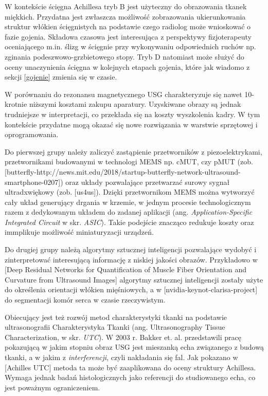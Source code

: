 W kontekście ścięgna Achillesa tryb B jest użyteczny do obrazowania tkanek miękkich. Przydatna jest zwłaszcza możliwość zobrazowania ukierunkowania struktur włókien ścięgnistych na podstawie czego radiolog może wnioskować o fazie gojenia. Składowa czasowa jest interesująca z perspektywy fizjoterapeuty oceniającego m.in. ślizg w ścięgnie przy wykonywaniu odpowiednich ruchów np. zginania podeszwowo-grzbietowego stopy. Tryb D natomiast może służyć do oceny unaczynienia ścięgna w kolejnych etapach gojenia, które jak wiadomo z sekcji \ref{gojenie} zmienia się w czasie.

W porównaniu do rezonansu magnetycznego USG charakteryzuje się nawet 10-krotnie niższymi kosztami zakupu aparatury. Uzyskiwane obrazy są jednak trudniejsze w interpretacji, co przekłada się na koszty wyszkolenia kadry. W tym kontekście przydatne mogą okazać się nowe rozwiązania w warstwie sprzętowej i oprogramowania. 

Do pierwszej grupy należy zaliczyć zastąpienie przetworników z piezoelektrykami, przetwornikami budowanymi w technologi MEMS np. cMUT, czy pMUT (zob. [butterfly-http://news.mit.edu/2018/startup-butterfly-network-ultrasound-smartphone-0207]) oraz układy pozwalające przetwarzać surowy sygnał ultradxwiękowy (zob. [us4us]). Dzięki przetwornikom MEMS można wytworzyć cały układ generujący drgania w krzemie, w jednym procesie technologicznym razem z dedykowanym układem do zadanej aplikacji (ang. \textit{Application-Specific Integrated Circuit} w skr. \textit{ASIC}). Takie podejście znacząco redukuje koszty oraz immplikuje możliwość miniaturyzacji urządzeń.

Do drugiej grupy należą algorytmy sztucznej inteligencji pozwalające wydobyć i zinterpretować interesującą informację z niskiej jakości obrazów. Przykładowo w [Deep Residual Networks for Quantification
of Muscle Fiber Orientation and Curvature
from Ultrasound Images] algorytmy sztucznej inteligencji zostały użyte do określenia orientacji włókien mięśniowych, a w [nvidia-keynot-clarisa-project] do segmentacji komór serca w czasie rzeczywistym. 

Obiecujący jest też rozwój metod charakterystyki tkanki na podstawie ultrasonografii
Charakterystyka Tkanki (ang. Ultrasonography Tissue Characterization, w skr. \textit{UTC}). W 2003 r. Bakker et. al. przedstawili pracę pokazującą w jakim stopniu obraz USG jest mieszanką echa związanego z budową tkanki, a w jakim z \textit{interferencji}, czyli nakładania się fal. Jak pokazano w [Achilles UTC] metoda ta może być zaaplikowana do oceny struktury Achillesa. Wymaga jednak badań histologicznych jako referencji do studiowanego echa, co jest poważnym ograniczeniem. 

